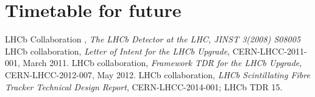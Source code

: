 \documentclass[paper=a4, fontsize=10pt]{scrartcl}
\numberwithin{equation}{section}		%
\numberwithin{figure}{section}			%
\numberwithin{table}{section}				%
\begin{document}
\section{Timetable for future}



\begin{thebibliography}{100}
 LHCb Collaboration , \textit{The LHCb Detector at the LHC, JINST 3(2008) S08005}
 LHCb collaboration, \textit{Letter of Intent for the LHCb Upgrade}, CERN-LHCC-2011-001, March 2011.
 LHCb collaboration, \textit{Framework TDR for the LHCb Upgrade}, CERN-LHCC-2012-007, May 2012.
 LHCb collaboration, \textit{LHCb Scintillating Fibre Tracker Technical Design Report}, CERN-LHCC-2014-001; LHCb TDR 15.
\end{thebibliography}
\end{document}
